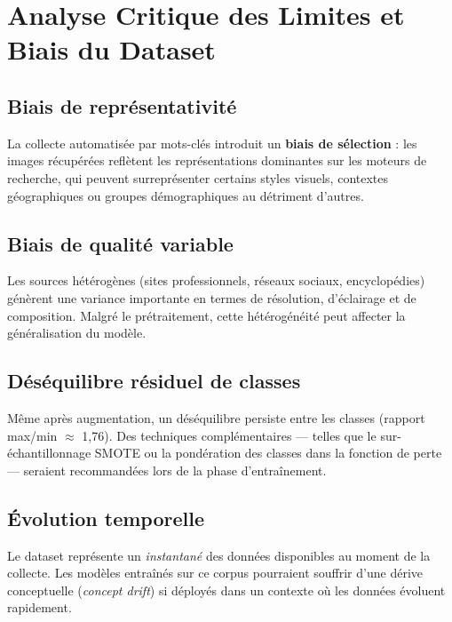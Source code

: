 \documentclass[12pt,a4paper]{article}
\begin{document}
\section{Analyse Critique des Limites et Biais du Dataset}

\subsection{Biais de représentativité}

La collecte automatisée par mots-clés introduit un \textbf{biais de sélection} :
les images récupérées reflètent les représentations dominantes sur les moteurs de
recherche, qui peuvent surreprésenter certains styles visuels, contextes
géographiques ou groupes démographiques au détriment d'autres.

\subsection{Biais de qualité variable}

Les sources hétérogènes (sites professionnels, réseaux sociaux, encyclopédies)
génèrent une variance importante en termes de résolution, d'éclairage et de
composition. Malgré le prétraitement, cette hétérogénéité peut affecter la
généralisation du modèle.

\subsection{Déséquilibre résiduel de classes}

Même après augmentation, un déséquilibre persiste entre les classes (rapport
max/min $\approx$ 1,76). Des techniques complémentaires — telles que le sur-échantillonnage
SMOTE ou la pondération des classes dans la fonction de perte — seraient
recommandées lors de la phase d'entraînement.

\subsection{Évolution temporelle}

Le dataset représente un \textit{instantané} des données disponibles au moment de la
collecte. Les modèles entraînés sur ce corpus pourraient souffrir d'une dérive
conceptuelle (\textit{concept drift}) si déployés dans un contexte où les données
évoluent rapidement.
\end{document}
